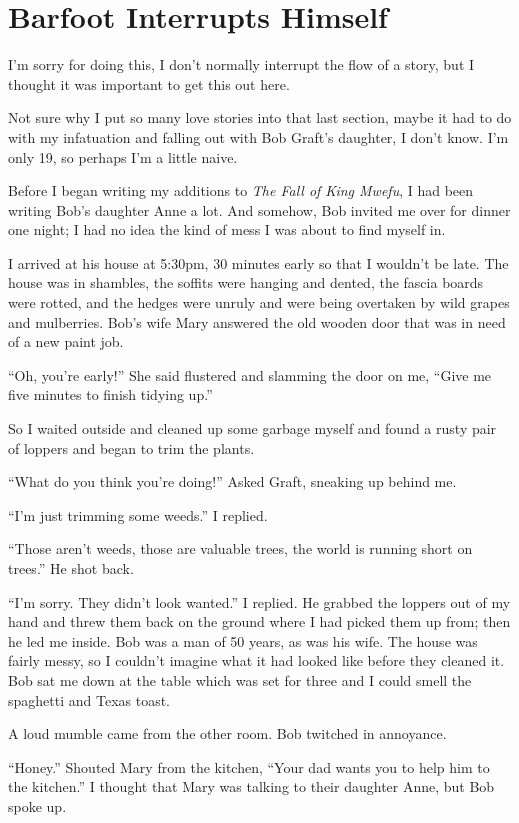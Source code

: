 \section{Barfoot Interrupts Himself}
I'm sorry for doing this, I don't normally interrupt the flow of a story, but I thought it was important to get this out here.

Not sure why I put so many love stories into that last section, maybe it had to do with my infatuation and falling out with Bob Graft's daughter, I don't know. I'm only 19, so perhaps I'm a little naive.

Before I began writing my additions to \emph{The Fall of King Mwefu},
I had been writing Bob's daughter Anne a lot. And somehow, Bob invited me over for dinner one night; I had no idea the kind of mess I was about to find myself in.

I arrived at his house at 5:30pm, 30 minutes early so that I wouldn't be late. The house was in shambles, the soffits were hanging and dented, the fascia boards were rotted, and the hedges were unruly and were being overtaken by wild grapes and mulberries. Bob's wife Mary answered the old wooden door that was in need of a new paint job.

``Oh, you're early!'' She said flustered and slamming the door on me, ``Give me five minutes to finish tidying up.''

So I waited outside and cleaned up some garbage myself and found a rusty pair of loppers and began to trim the plants.

``What do you think you're doing!'' Asked Graft, sneaking up behind me.

``I'm just trimming some weeds.'' I replied.

``Those aren't weeds, those are valuable trees, the world is running short on trees.'' He shot back.

``I'm sorry. They didn't look wanted.'' I replied. He grabbed the loppers out of my hand and threw them back on the ground where I had picked them up from; then he led me inside. Bob was a man of 50 years, as was his wife.
The house was fairly messy, so I couldn't imagine what it had looked like before they cleaned it.
Bob sat me down at the table which was set for three and I could smell the spaghetti and Texas toast.

A loud mumble came from the other room. Bob twitched in annoyance.

``Honey.'' Shouted Mary from the kitchen, ``Your dad wants you to help him to the kitchen.''
I thought that Mary was talking to their daughter Anne, but Bob spoke up.

